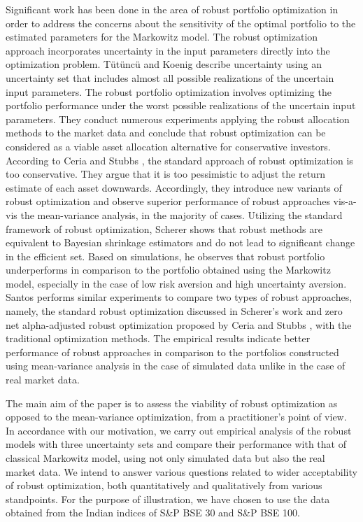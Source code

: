 \documentclass[12pt]{article}
\numberwithin{equation}{section}
\begin{document}
Significant work has been done in the area of robust portfolio optimization in order to address the concerns about the sensitivity of the optimal portfolio to the estimated parameters for the Markowitz model. The robust optimization approach incorporates uncertainty in the input parameters directly into the optimization problem. T{\"u}t{\"u}nc{\"u} and Koenig \cite{Tutuncu04} describe uncertainty using an uncertainty set that includes almost all possible realizations of the uncertain input parameters. The robust portfolio optimization involves optimizing the portfolio performance under the worst possible realizations of the uncertain input parameters. They conduct numerous experiments applying the robust allocation methods to the market data and conclude that robust optimization can be considered as a viable asset allocation alternative for conservative investors. According to Ceria and Stubbs \cite{Ceria06}, the standard approach of robust optimization is too conservative. They argue that it is too pessimistic to adjust the return estimate of each asset downwards. Accordingly, they introduce new variants of robust optimization and observe superior performance of robust approaches vis-a-vis the mean-variance analysis, in the majority of cases. Utilizing the standard framework of robust optimization, Scherer \cite{Scherer07} shows that robust methods are equivalent to Bayesian shrinkage estimators and do not lead to significant change in the efficient set. Based on simulations, he observes that robust portfolio underperforms in comparison to the portfolio obtained using the Markowitz model, especially in the case of low risk aversion and high uncertainty aversion. Santos \cite{Santos10} performs similar experiments to compare two types of robust approaches, namely, the standard robust optimization discussed in Scherer's work \cite{Scherer07} and zero net alpha-adjusted robust optimization proposed by Ceria and Stubbs \cite{Ceria06}, with the traditional optimization methods. The empirical results indicate better performance of robust approaches in comparison to the portfolios constructed using mean-variance analysis in the case of simulated data unlike in the case of real market data.

The main aim of the paper is to assess the viability of robust optimization as opposed to the mean-variance optimization, from a practitioner's point of view. In accordance with our motivation, we carry out empirical analysis of the robust models with three uncertainty sets and compare their performance with that of classical Markowitz model, using not only simulated data but also the real market data. We intend to answer various questions related to wider acceptability of robust optimization, both quantitatively and qualitatively from various standpoints. For the purpose of illustration, we have chosen to use the data obtained from the Indian indices of S\&P BSE 30 and S\&P BSE 100.
\end{document}
